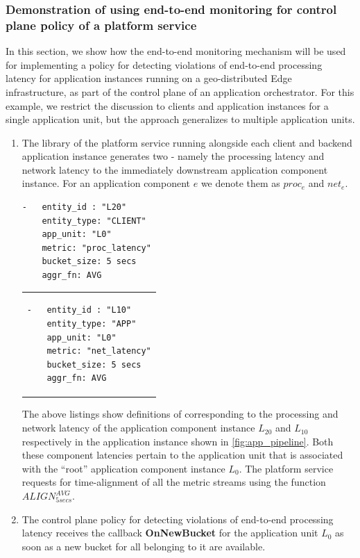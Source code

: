 \subsubsection{Demonstration of using end-to-end monitoring for control plane policy of a platform service}
In this section, we show how the end-to-end monitoring mechanism will be used for implementing a policy for detecting violations of end-to-end processing latency for application instances running on a geo-distributed Edge infrastructure, as part of the control plane of an application orchestrator. For this example, we restrict the discussion to clients and application instances for a single application unit, but the approach generalizes to multiple application units.
\begin{enumerate}
\item The library of the platform service running alongside each client and backend application instance generates two  - namely the processing latency and network latency to the immediately downstream application component instance. For an application component $e$ we denote them as $proc_e$ and $net_e$.\\
\begin{minipage}{0.45\textwidth}
\begin{verbatim}
-   entity_id : "L20"
    entity_type: "CLIENT"
    app_unit: "L0"
    metric: "proc_latency"
    bucket_size: 5 secs
    aggr_fn: AVG
\end{verbatim}
\end{minipage}%
\hfill
\begin{minipage}{0.45\textwidth}
\begin{tabular}{p{\textwidth}}
\begin{verbatim}
-   entity_id : "L10"
    entity_type: "APP"
    app_unit: "L0"
    metric: "net_latency"
    bucket_size: 5 secs
    aggr_fn: AVG
\end{verbatim}
\end{tabular}
\end{minipage}

The above listings show definitions of  corresponding to the processing and network latency of the application component instance $L_{20}$ and $L_{10}$ respectively in the application instance shown in \cref{fig:app_pipeline}. Both these component latencies pertain to the application unit that is associated with the ``root'' application component instance $L_0$. The platform service requests for time-alignment of all the metric streams using the function $ALIGN^{AVG}_{5secs}$. 
\item The control plane policy for detecting violations of end-to-end processing latency receives the callback \textbf{OnNewBucket} for the application unit $L_0$ as soon as a new bucket for all  belonging to it are available. 


\end{enumerate}
